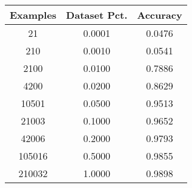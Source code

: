 \begin{tabular}{ccc}
\toprule
Examples & Dataset Pct. & Accuracy \\
\midrule
21 & 0.0001 & 0.0476 \\
210 & 0.0010 & 0.0541 \\
2100 & 0.0100 & 0.7886 \\
4200 & 0.0200 & 0.8629 \\
10501 & 0.0500 & 0.9513 \\
21003 & 0.1000 & 0.9652 \\
42006 & 0.2000 & 0.9793 \\
105016 & 0.5000 & 0.9855 \\
210032 & 1.0000 & 0.9898 \\
\bottomrule
\end{tabular}
